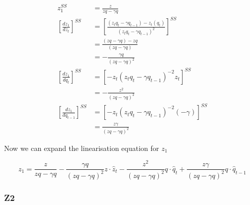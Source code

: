 \documentclass[11pt,preprint, authoryear]{elsarticle}
\numberwithin{equation}{section}
\numberwithin{figure}{section}
\numberwithin{table}{section}
\begin{document}
\[\begin{aligned}
z_{1}^{SS}&= \frac{z}{z q-\gamma q} \\
\left[\frac{dz_{1}}{dz_{t}} \right]^{SS} &=
\left[\frac{\left(z_{t} q_{t}-\gamma q_{t-1}\right)-z_{t}\left(q_{t}\right)}{\left(z_{t} q_{t}-\gamma 
q_{t-1}\right)^{2}}\right]^{SS}\\
&=\frac{(z q-\gamma q)-z q}{(z q-\gamma q)}\\
&=-\frac{\gamma q}{(zq-\gamma q)^2}\\
\left[\frac{dz_{1}}{dq_{t}} \right]^{SS} &= \left[-z_{t}\left(z_{t} q_{t}-\gamma q_{t-1}\right)^{-2} z_{t} \right]^{SS} \\
&= -\frac{z^{2}}{\left(z q-\gamma q\right)^2}\\
\left[\frac{dz_{1}}{dq_{t-1}} \right]^{SS} &= \left[-z_{t}\left(z_{t} q_{t}-\gamma q_{t-1}\right)^{-2}(-\gamma)\right]^{SS} \\
&=\frac{z \gamma}{(z q-\gamma q)^2}
\end{aligned}\]

Now we can expand the linearisation equation for \(z_1\)

\[z_1 = \frac{z}{z q-\gamma q} 
- \frac{\gamma q}{(z q-\gamma q)^2} z \cdot \hat{z}_t
- \frac{z^{2}}{(z q-\gamma q)^2} q \cdot \hat{q}_t
+ \frac{z \gamma}{(z q-\gamma q)^2} q \cdot \hat{q}_{t-1}\]

\hypertarget{z2}{%
\subsubsection{Z2}\label{z2}}
\end{document}
